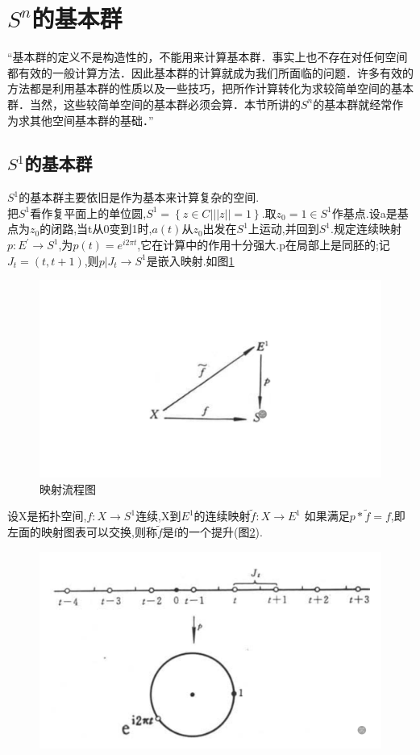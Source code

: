 \section{\(S^n\)的基本群}
“基本群的定义不是构造性的，不能用来计算基本群．事实上也不存在对任何空间都有效的一般计算方法．因此基本群的计算就成为我们所面临的问题．许多有效的方法都是利用基本群的性质以及一些技巧，把所作计算转化为求较简单空间的基本群．当然，这些较简单空间的基本群必须会算．本节所讲的\(S^n\)的基本群就经常作为求其他空间基本群的基础．”
\subsection*{\(S^1\)的基本群}
\(S^1\)的基本群主要依旧是作为基本来计算复杂的空间. \\
把\(S^1\)看作复平面上的单位圆,\(S^1 = \left\{z \in C | ||z|| =1 \right\}\).取\(z_0 = 1 \in S^1\)作基点.设a是基点为\(z_0\)的闭路,当t从0变到1时,\(a(t)\)从\(z_0\)出发在\(S^1\)上运动,并回到\(S^1\).规定连续映射\(p : E^{'} \rightarrow S^1\),为\(p(t) = e^{i2\pi t}\),它在计算中的作用十分强大.p在局部上是同胚的;记\(J_t = (t,t+1)\),则\(p|J_t \rightarrow S^1\)是嵌入映射.如图\ref{fig:enter-label_22}
\begin{figure}[H]
    \centering
    \includegraphics[width=0.5\linewidth]{image_22.png}
    \caption{映射流程图}
    \label{fig:enter-label_22}
\end{figure}
设X是拓扑空间,\(f: X \rightarrow S^1\)连续,X到\(E^1\)的连续映射\(\widetilde{f} : X \rightarrow  E^1\) 如果满足\(p * \widetilde{f} = f \),即左面的映射图表可以交换,则称\(\widetilde{f}\)是f的一个提升(图\ref{fig:enter-label_23}).
\begin{figure}[H]
    \centering
    \includegraphics[width=0.5\linewidth]{image_23.png}
    \caption{}
    \label{fig:enter-label_23}
\end{figure}
